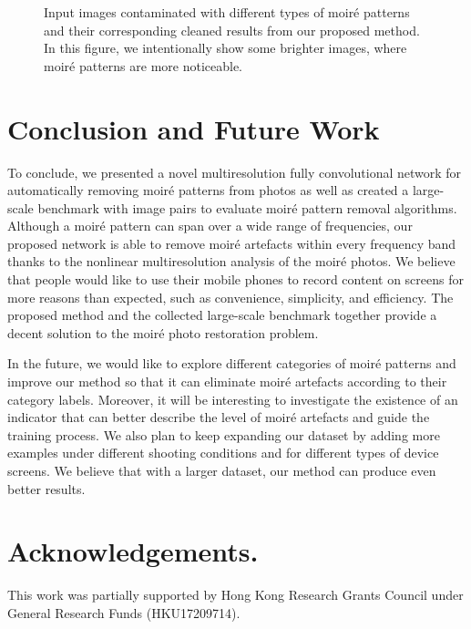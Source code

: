 \documentclass[journal]{IEEEtran}
\begin{document}
\begin{figure*}
\vspace{-.5em}

\caption{Input images contaminated with different types of moir\'{e} patterns and their corresponding cleaned results from our proposed method. In this figure, we intentionally show some brighter images, where moir\'{e} patterns are more noticeable.}
\label{fig:result1}
\end{figure*}




\section{Conclusion and Future Work}
To conclude, we presented a novel multiresolution fully convolutional network for automatically removing moir\'{e} patterns from photos as well as created a large-scale benchmark with  image pairs to evaluate moir\'{e} pattern removal algorithms. Although a moir\'{e} pattern can span over a wide range of frequencies, our proposed network is able to remove moir\'{e} artefacts within every frequency band thanks to the nonlinear multiresolution analysis of the moir\'{e} photos. We believe that people would like to use their mobile phones to record content on screens for more reasons than expected, such as convenience, simplicity, and efficiency. The proposed method and the collected large-scale benchmark together provide a decent solution to the moir\'{e} photo restoration problem. 

In the future, we would like to explore different categories of moir\'{e} patterns and improve our method so that it can eliminate moir\'{e} artefacts according to their category labels. Moreover, it will be interesting to investigate the existence of an indicator that can better describe the level of moir\'{e} artefacts and guide the training process. We also plan to keep expanding our dataset by adding more examples under different shooting conditions and for different types of device screens. We believe that with a larger dataset, our method can produce even better results. 



\section*{Acknowledgements.} 
This work was partially supported by Hong Kong Research Grants Council under General Research Funds (HKU17209714).





\ifCLASSOPTIONcaptionsoff
  \newpage
\fi











\end{document}
